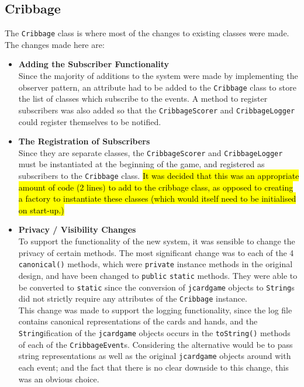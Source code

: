 \documentclass{article}
\begin{document}
\subsection{Cribbage}
The \verb|Cribbage| class is where most of the changes to existing classes were made. The changes made here are:
\begin{itemize}
    \item \textbf{Adding the Subscriber Functionality}\\[2mm]
    Since the majority of additions to the system were made by implementing the observer pattern, an attribute had to be added to the \verb|Cribbage| class to store the list of classes which subscribe to the events. A method to register subscribers was also added so that the \verb|CribbageScorer| and \verb|CribbageLogger| could register themselves to be notified.
    \item \textbf{The Registration of Subscribers}\\[2mm]
    Since they are separate classes, the \verb|CribbageScorer| and \verb|CribbageLogger| must be instantiated at the beginning of the game, and registered as subscribers to the \verb|Cribbage| class. \hl{It was decided that this was an appropriate amount of code (2 lines) to add to the cribbage class, as opposed to creating a factory to instantiate these classes (which would itself need to be initialised on start-up.)}
    \item \textbf{Privacy / Visibility Changes}\\[2mm] 
    To support the functionality of the new system, it was sensible to change the privacy of certain methods. The most significant change was to each of the 4 \verb|canonical()| methods, which were \verb|private| instance methods in the original design, and have been changed to \verb|public| \verb|static| methods. They were able to be converted to \verb|static| since the conversion of \verb|jcardgame| objects to \verb|String|s did not strictly require any attributes of the \verb|Cribbage| instance.\\[2mm]
    This change was made to support the logging functionality, since the log file contains canonical representations of the cards and hands, and the \verb|String|ification of the \verb|jcardgame| objects occurs in the \verb|toString()| methods of each of the \verb|CribbageEvent|s. Considering the alternative would be to pass string representations as well as the original \verb|jcardgame| objects around with each event; and the fact that there is no clear downside to this change, this was an obvious choice.
\end{itemize}

% 
\end{document}
